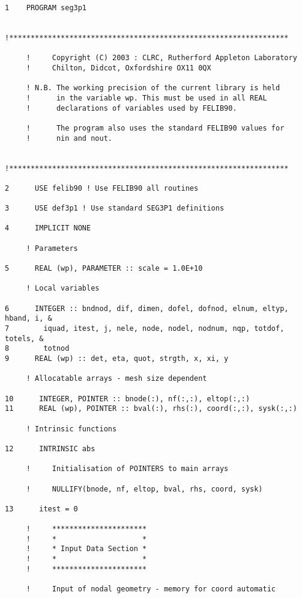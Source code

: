 \begin{verbatim}     
1    PROGRAM seg3p1
     
     !*****************************************************************
     
     !     Copyright (C) 2003 : CLRC, Rutherford Appleton Laboratory
     !     Chilton, Didcot, Oxfordshire OX11 0QX
     
     ! N.B. The working precision of the current library is held
     !      in the variable wp. This must be used in all REAL
     !      declarations of variables used by FELIB90.
     
     !      The program also uses the standard FELIB90 values for 
     !      nin and nout.
     
     !*****************************************************************
     
2      USE felib90 ! Use FELIB90 all routines
     
3      USE def3p1 ! Use standard SEG3P1 definitions
     
4      IMPLICIT NONE
     
     ! Parameters
     
5      REAL (wp), PARAMETER :: scale = 1.0E+10
     
     ! Local variables
     
6      INTEGER :: bndnod, dif, dimen, dofel, dofnod, elnum, eltyp, hband, i, &
7        iquad, itest, j, nele, node, nodel, nodnum, nqp, totdof, totels, &
8        totnod
9      REAL (wp) :: det, eta, quot, strgth, x, xi, y
     
     ! Allocatable arrays - mesh size dependent
     
10      INTEGER, POINTER :: bnode(:), nf(:,:), eltop(:,:)
11      REAL (wp), POINTER :: bval(:), rhs(:), coord(:,:), sysk(:,:)
     
     ! Intrinsic functions
     
12      INTRINSIC abs
     
     !     Initialisation of POINTERS to main arrays
     
     !     NULLIFY(bnode, nf, eltop, bval, rhs, coord, sysk)
     
13      itest = 0
     
     !     **********************
     !     *                    *
     !     * Input Data Section *
     !     *                    *
     !     **********************
     
     !     Input of nodal geometry - memory for coord automatic
     

\end{verbatim}
